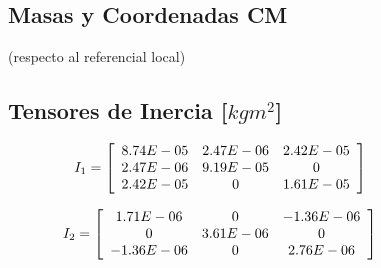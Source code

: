 \subsection{Masas y Coordenadas CM}

\begin{table}[H]%
\centering
    \begin{center}
    \caption{Masas y Coordenadas de los Centros de Masa} 
    (respecto al referencial local)
    \centering
    \bigskip
    \end{center}
    \label{ref:TablaCentrosMasa}
\end{table}

\subsection{Tensores de Inercia [$kgm^2$]}

\begin{equation*}
    \hspace{-10mm}
    I_1 = \left[
        \begin{array}{ccc}
        8.74E-05&2.47E-06&2.42E-05\\
        2.47E-06&9.19E-05&0\\     
        2.42E-05&0&1.61E-05\\
        \end{array}\right]\hspace{10mm}
\end{equation*}

\begin{equation*}
    \hspace{-10mm}
    I_2 = \left[
        \begin{array}{ccc}
        
        1.71E-06&0&-1.36E-06\\
        0&3.61E-06&0\\
        -1.36E-06&0&2.76E-06\\
        
        \end{array}\right]\hspace{10mm}
\end{equation*}

